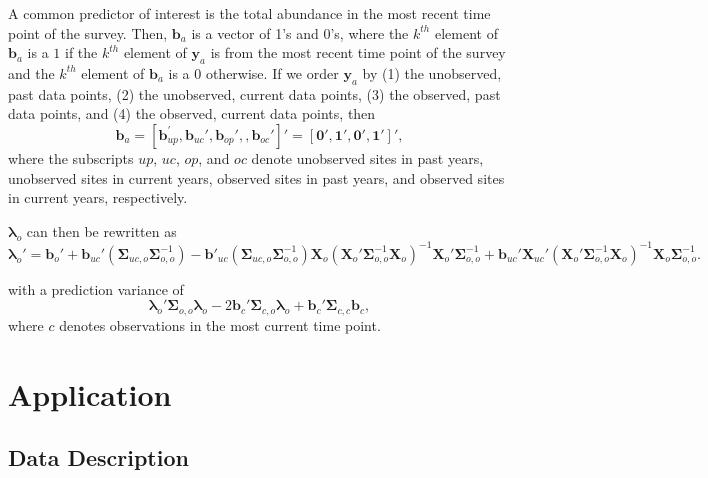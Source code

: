 \documentclass[]{interact}
\theoremstyle{plain}%
\theoremstyle{definition}
\theoremstyle{remark}
\begin{document}
A common predictor of interest is the total abundance in the most recent
time point of the survey. Then, \(\mathbf{b}_a\) is a vector of 1's and
0's, where the \(k^{th}\) element of \(\mathbf{b}_a\) is a \(1\) if the
\(k^{th}\) element of \(\mathbf{y}_a\) is from the most recent time
point of the survey and the \(k^{th}\) element of \(\mathbf{b}_a\) is a
0 otherwise. If we order \(\mathbf{y}_a\) by (1) the unobserved, past
data points, (2) the unobserved, current data points, (3) the observed,
past data points, and (4) the observed, current data points, then
\mbox{} \begin{equation}
\mathbf{b}_a = [\mathbf{b}_{up}^\prime, \mathbf{b}_{uc}', \mathbf{b}_{op}', , \mathbf{b}_{oc}']' = [\mathbf{0}', \mathbf{1}', \mathbf{0}', \mathbf{1}']',
\end{equation} \noindent where the subscripts \(up\), \(uc\), \(op\),
and \(oc\) denote unobserved sites in past years, unobserved sites in
current years, observed sites in past years, and observed sites in
current years, respectively.

\(\bm{\lambda}_o\) can then be rewritten as \mbox{} \begin{equation} 
\label{equation:lambdacurrentpred}
\bm{\lambda}_o' = \mathbf{b}_{o}' + \mathbf{b}_{uc}' (\bm{\Sigma}_{uc, o}\bm{\Sigma}_{o, o}^{-1}) - \mathbf{b}'_{uc}(\bm{\Sigma}_{uc, o} \bm{\Sigma}_{o, o}^{-1})\mathbf{X}_o(\mathbf{X}_o'\bm{\Sigma}_{o, o}^{-1}\mathbf{X}_o)^{-1}\mathbf{X}_o'\bm{\Sigma}_{o, o}^{-1} + \mathbf{b}_{uc}' \mathbf{X}_{uc}'(\mathbf{X}_o'\bm{\Sigma}_{o, o}^{-1}\mathbf{X}_o)^{-1}\mathbf{X}_o \bm{\Sigma}_{o, o}^{-1}.
\end{equation}

with a prediction variance of \mbox{} \begin{equation}
\label{equation:lambdacurrentvar}
\bm{\lambda}_o'\bm{\Sigma}_{o, o}\bm{\lambda}_o - 2 \mathbf{b}_{c}' \bm{\Sigma}_{c, o} \bm{\lambda}_o + \mathbf{b}_{c}' \bm{\Sigma}_{c, c} \mathbf{b}_{c},
\end{equation} \noindent where \(c\) denotes observations in the most
current time point.

\section{Application} \label{section:Application}

\subsection{Data Description}
\end{document}

